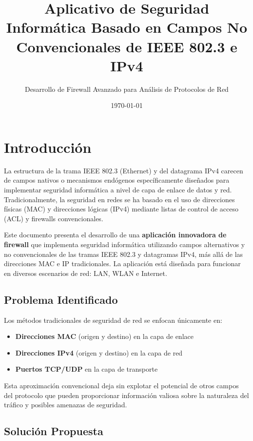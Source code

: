 \documentclass[12pt,a4paper]{article}
\title{\textbf{Aplicativo de Seguridad Informática Basado en Campos No Convencionales de IEEE 802.3 e IPv4}}
\author{Desarrollo de Firewall Avanzado para Análisis de Protocolos de Red}
\date{\today}
\begin{document}
\maketitle

\tableofcontents
\newpage

\section{Introducción}

La estructura de la trama IEEE 802.3 (Ethernet) y del datagrama IPv4 carecen de campos nativos o mecanismos endógenos específicamente diseñados para implementar seguridad informática a nivel de capa de enlace de datos y red. Tradicionalmente, la seguridad en redes se ha basado en el uso de direcciones físicas (MAC) y direcciones lógicas (IPv4) mediante listas de control de acceso (ACL) y firewalls convencionales.

Este documento presenta el desarrollo de una \textbf{aplicación innovadora de firewall} que implementa seguridad informática utilizando campos alternativos y no convencionales de las tramas IEEE 802.3 y datagramas IPv4, más allá de las direcciones MAC e IP tradicionales. La aplicación está diseñada para funcionar en diversos escenarios de red: LAN, WLAN e Internet.

\subsection{Problema Identificado}

Los métodos tradicionales de seguridad de red se enfocan únicamente en:
\begin{itemize}
    \item \textbf{Direcciones MAC} (origen y destino) en la capa de enlace
    \item \textbf{Direcciones IPv4} (origen y destino) en la capa de red
    \item \textbf{Puertos TCP/UDP} en la capa de transporte
\end{itemize}

Esta aproximación convencional deja sin explotar el potencial de otros campos del protocolo que pueden proporcionar información valiosa sobre la naturaleza del tráfico y posibles amenazas de seguridad.

\subsection{Solución Propuesta}
\end{document}
